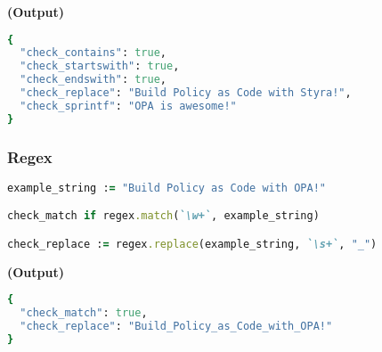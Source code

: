 \documentclass[twocolumn]{article}
\begin{document}
\textbf{\tiny{(Output)}}
\begin{lstlisting}[language=Ruby]
{
  "check_contains": true,
  "check_startswith": true,
  "check_endswith": true,
  "check_replace": "Build Policy as Code with Styra!",
  "check_sprintf": "OPA is awesome!"
}
\end{lstlisting}



\vspace{-1em}
\subsubsection*{Regex}



\begin{lstlisting}[language=Ruby]
example_string := "Build Policy as Code with OPA!"

check_match if regex.match(`\w+`, example_string)

check_replace := regex.replace(example_string, `\s+`, "_")
\end{lstlisting}



\textbf{\tiny{(Output)}}
\begin{lstlisting}[language=Ruby]
{
  "check_match": true,
  "check_replace": "Build_Policy_as_Code_with_OPA!"
}
\end{lstlisting}
\end{document}
